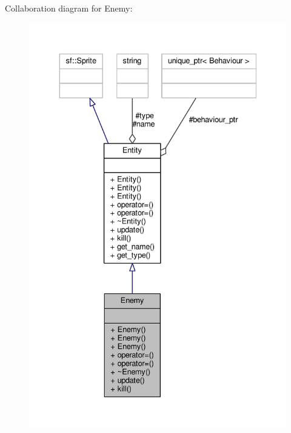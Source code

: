 Collaboration diagram for Enemy\+:\nopagebreak
\begin{figure}[H]
\begin{center}
\leavevmode
\includegraphics[width=336pt]{classEnemy__coll__graph}
\end{center}
\end{figure}
